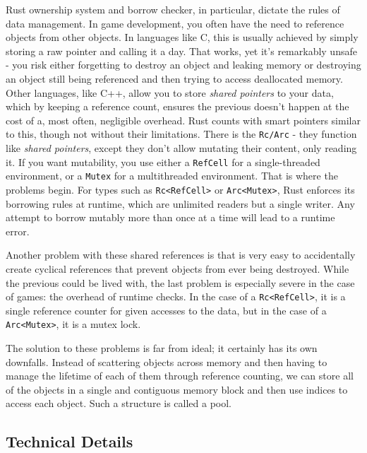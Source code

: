 \documentclass[
]{book}
\theoremstyle{definition}
\theoremstyle{definition}
\theoremstyle{definition}
\theoremstyle{definition}
\theoremstyle{remark}
\begin{document}
Rust ownership system and borrow checker, in particular, dictate the rules of data management. In game development, you often have the need to reference objects from other objects. In languages like C, this is usually achieved by simply storing a raw pointer and calling it a day. That works, yet it's remarkably unsafe - you risk either forgetting to destroy an object and leaking memory or destroying an object still being referenced and then trying to access deallocated memory. Other languages, like C++, allow you to store \emph{shared pointers} to your data, which by keeping a reference count, ensures the previous doesn't happen at the cost of a, most often, negligible overhead. Rust counts with smart pointers similar to this, though not without their limitations. There is the \texttt{Rc/Arc} - they function like \emph{shared pointers}, except they don't allow mutating their content, only reading it. If you want mutability, you use either a \texttt{RefCell} for a single-threaded environment, or a \texttt{Mutex} for a multithreaded environment. That is where the problems begin. For types such as \texttt{Rc\textless{}RefCell\textgreater{}} or \texttt{Arc\textless{}Mutex\textgreater{}}, Rust enforces its borrowing rules at runtime, which are unlimited readers but a single writer. Any attempt to borrow mutably more than once at a time will lead to a runtime error.

Another problem with these shared references is that is very easy to accidentally create cyclical references that prevent objects from ever being destroyed. While the previous could be lived with, the last problem is especially severe in the case of games: the overhead of runtime checks. In the case of a \texttt{Rc\textless{}RefCell\textgreater{}}, it is a single reference counter for given accesses to the data, but in the case of a \texttt{Arc\textless{}Mutex\textgreater{}}, it is a mutex lock.

The solution to these problems is far from ideal; it certainly has its own downfalls. Instead of scattering objects across memory and then having to manage the lifetime of each of them through reference counting, we can store all of the objects in a single and contiguous memory block and then use indices to access each object. Such a structure is called a pool.

\subsection{Technical Details}\label{technical-details}
\end{document}
